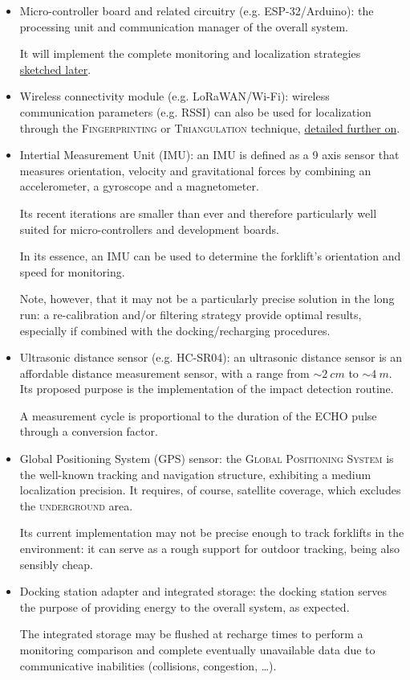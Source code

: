 \documentclass[a4paper,11pt]{article} %
\begin{document}
\begin{itemize}
    \item Micro-controller board and related circuitry (e.g. ESP-32/Arduino): the processing unit and communication manager of the overall system.

        It will implement the complete monitoring and localization strategies \hyperref[localization]{sketched later}.
    \item Wireless connectivity module (e.g. LoRaWAN/Wi-Fi): wireless communication parameters (e.g. RSSI) can also be used for localization through the \textsc{Fingerprinting} or \textsc{Triangulation} technique, \hyperref[localization]{detailed further on}.
    \item Intertial Measurement Unit (IMU): an IMU is defined as a 9 axis sensor that measures orientation, velocity and gravitational forces by combining an accelerometer, a gyroscope and a magnetometer.

        Its recent iterations are smaller than ever and therefore particularly well suited for micro-controllers and development boards.

        In its essence, an IMU can be used to determine the forklift's orientation and speed for monitoring.

        Note, however, that it may not be a particularly precise solution in the long run: a re-calibration and/or filtering strategy provide optimal results, especially if combined with the docking/recharging procedures.
    \item Ultrasonic distance sensor (e.g. HC-SR04): an ultrasonic distance sensor is an affordable distance measurement sensor, with a range from $\sim 2\ cm$ to $\sim 4\ m$. Its proposed purpose is the implementation of the impact detection routine.

        A measurement cycle is proportional to the duration of the \textsc{ECHO} pulse through a conversion factor.
    \item Global Positioning System (GPS) sensor: the \textsc{Global Positioning System} is the well-known tracking and navigation structure, exhibiting a medium localization precision. It requires, of course, satellite coverage, which excludes the \textsc{underground} area.

        Its current implementation may not be precise enough to track forklifts in the environment: it can serve as a rough support for outdoor tracking, being also sensibly cheap.
    \item Docking station adapter and integrated storage: the docking station serves the purpose of providing energy to the overall system, as expected.

        The integrated storage may be flushed at recharge times to perform a monitoring comparison and complete eventually unavailable data due to communicative inabilities (collisions, congestion, \dots).
\end{itemize}
\end{document}
